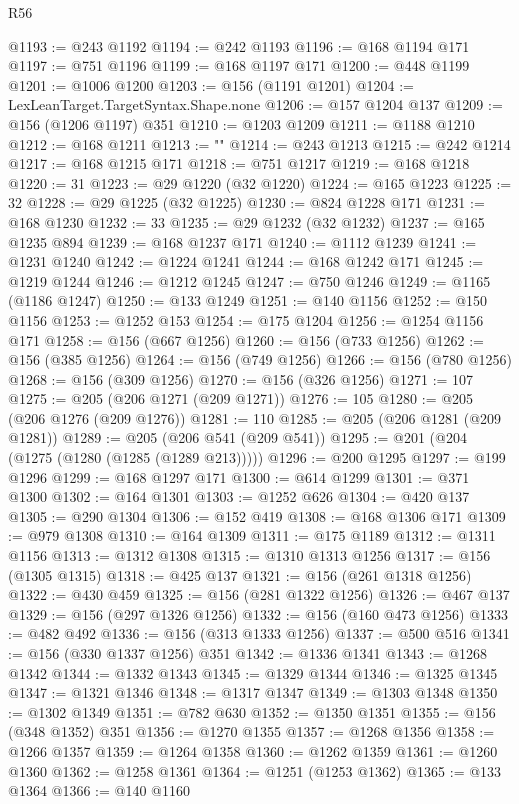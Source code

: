 \begin{lexlean}{R56}
\begin{coremodule}
{@1193 := @243 @1192
@1194 := @242 @1193
@1196 := @168 @1194 @171
@1197 := @751 @1196
@1199 := @168 @1197 @171
@1200 := @448 @1199
@1201 := @1006 @1200
@1203 := @156 (@1191 @1201)
@1204 := LexLeanTarget.TargetSyntax.Shape.none
@1206 := @157 @1204 @137
@1209 := @156 (@1206 @1197) @351
@1210 := @1203 @1209
@1211 := @1188 @1210
@1212 := @168 @1211
@1213 := "}"
@1214 := @243 @1213
@1215 := @242 @1214
@1217 := @168 @1215 @171
@1218 := @751 @1217
@1219 := @168 @1218
@1220 := 31
@1223 := @29 @1220 (@32 @1220)
@1224 := @165 @1223
@1225 := 32
@1228 := @29 @1225 (@32 @1225)
@1230 := @824 @1228 @171
@1231 := @168 @1230
@1232 := 33
@1235 := @29 @1232 (@32 @1232)
@1237 := @165 @1235 @894
@1239 := @168 @1237 @171
@1240 := @1112 @1239
@1241 := @1231 @1240
@1242 := @1224 @1241
@1244 := @168 @1242 @171
@1245 := @1219 @1244
@1246 := @1212 @1245
@1247 := @750 @1246
@1249 := @1165 (@1186 @1247)
@1250 := @133 @1249
@1251 := @140 @1156
@1252 := @150 @1156
@1253 := @1252 @153
@1254 := @175 @1204
@1256 := @1254 @1156 @171
@1258 := @156 (@667 @1256)
@1260 := @156 (@733 @1256)
@1262 := @156 (@385 @1256)
@1264 := @156 (@749 @1256)
@1266 := @156 (@780 @1256)
@1268 := @156 (@309 @1256)
@1270 := @156 (@326 @1256)
@1271 := 107
@1275 := @205 (@206 @1271 (@209 @1271))
@1276 := 105
@1280 := @205 (@206 @1276 (@209 @1276))
@1281 := 110
@1285 := @205 (@206 @1281 (@209 @1281))
@1289 := @205 (@206 @541 (@209 @541))
@1295 := @201 (@204 (@1275 (@1280 (@1285 (@1289 @213)))))
@1296 := @200 @1295
@1297 := @199 @1296
@1299 := @168 @1297 @171
@1300 := @614 @1299
@1301 := @371 @1300
@1302 := @164 @1301
@1303 := @1252 @626
@1304 := @420 @137
@1305 := @290 @1304
@1306 := @152 @419
@1308 := @168 @1306 @171
@1309 := @979 @1308
@1310 := @164 @1309
@1311 := @175 @1189
@1312 := @1311 @1156
@1313 := @1312 @1308
@1315 := @1310 @1313 @1256
@1317 := @156 (@1305 @1315)
@1318 := @425 @137
@1321 := @156 (@261 @1318 @1256)
@1322 := @430 @459
@1325 := @156 (@281 @1322 @1256)
@1326 := @467 @137
@1329 := @156 (@297 @1326 @1256)
@1332 := @156 (@160 @473 @1256)
@1333 := @482 @492
@1336 := @156 (@313 @1333 @1256)
@1337 := @500 @516
@1341 := @156 (@330 @1337 @1256) @351
@1342 := @1336 @1341
@1343 := @1268 @1342
@1344 := @1332 @1343
@1345 := @1329 @1344
@1346 := @1325 @1345
@1347 := @1321 @1346
@1348 := @1317 @1347
@1349 := @1303 @1348
@1350 := @1302 @1349
@1351 := @782 @630
@1352 := @1350 @1351
@1355 := @156 (@348 @1352) @351
@1356 := @1270 @1355
@1357 := @1268 @1356
@1358 := @1266 @1357
@1359 := @1264 @1358
@1360 := @1262 @1359
@1361 := @1260 @1360
@1362 := @1258 @1361
@1364 := @1251 (@1253 @1362)
@1365 := @133 @1364
@1366 := @140 @1160

\end{coremodule}
\end{lexlean}
